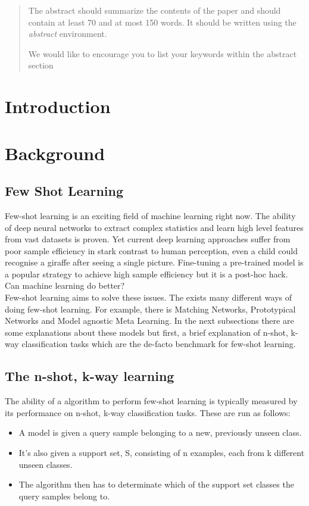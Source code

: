 \documentclass[runningheads,a4paper]{llncs}
\newcommand{\keywords}[1]{\par\addvspace\baselineskip
\noindent\keywordname\enspace\ignorespaces#1}
\begin{document}
\begin{abstract}
The abstract should summarize the contents of the paper and should
contain at least 70 and at most 150 words. It should be written using the
\emph{abstract} environment.
\keywords{We would like to encourage you to list your keywords within
the abstract section}
\end{abstract}

\section{Introduction}

\section{Background}

\subsection{Few Shot Learning}

Few-shot learning is an exciting field of machine learning right now. The ability of deep neural networks to extract complex statistics and learn high level features from vast datasets is proven. Yet current deep learning approaches suffer from poor sample efficiency in stark contrast to human perception, even a child could recognise a giraffe after seeing a single picture. Fine-tuning a pre-trained model is a popular strategy to achieve high sample efficiency but it is a post-hoc hack. Can machine learning do better? \\

Few-shot learning aims to solve these issues. The exists many different ways of doing few-shot learning. For example, there is Matching Networks, Prototypical Networks and Model agnostic Meta Learning. In the next subsections there are some explanations about these models but first, a brief explanation of n-shot, k-way classification tasks which are the de-facto benchmark for few-shot learning.

\subsection{The n-shot, k-way learning}

The ability of a algorithm to perform few-shot learning is typically measured by its performance on n-shot, k-way classification tasks. These are run as follows: 

\begin{itemize}
    \item A model is given a query sample belonging to a new, previously unseen class.
    \item It’s also given a support set, S, consisting of n examples, each from k different unseen classes.
    \item The algorithm then has to determinate which of the support set classes the query samples belong to.
\end{itemize}
\end{document}
